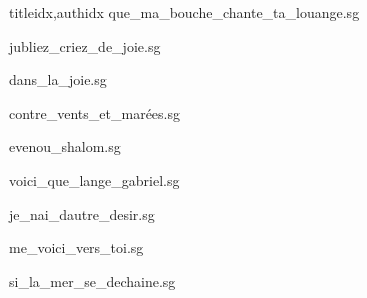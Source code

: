 \documentclass[
    ]{article}
\begin{document}
\begin{songs}{titleidx,authidx}
{que_ma_bouche_chante_ta_louange.sg}


{jubliez_criez_de_joie.sg}


{dans_la_joie.sg}


{contre_vents_et_marées.sg}


{evenou_shalom.sg}


{voici_que_lange_gabriel.sg}


{je_nai_dautre_desir.sg}


{me_voici_vers_toi.sg}


{si_la_mer_se_dechaine.sg}


\end{songs}
\end{document}
